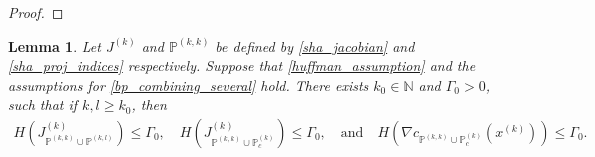 \documentclass{article}
\newtheorem{lemma}[theorem]{Lemma}
\theoremstyle{case}
\numberwithin{theorem}{subsection}
\newcommand{\huff}{{\Gamma_0}}
\newcommand{\naturals}{\mathbb N}
\newcommand{\xk}{x^{(k)}}
\newcommand{\trueactiveprojk}{{\mathbb P_c^{(k)}}}
\newcommand{\activeprojkk}{{\mathbb P^{(k, k)}}}
\newcommand{\activeprojkl}{{\mathbb P^{(k, l)}}}
\newcommand{\jackk}{{J^{(k)}}}
\newcommand{\jackkl}{{J^{(k)}_{\activeprojkk \cup \activeprojkl}}}
\newcommand{\jackt}{{J^{(k)}_{\activeprojkk \cup \trueactiveprojk}}}
\begin{document}
\begin{proof}
\end{proof}

\color{black}
\begin{lemma}
\label{huffman_constant_is_bounded}
Let $\jackk$ and $\activeprojkk$ be defined by \cref{sha_jacobian} and \cref{sha_proj_indices} respectively.
Suppose that \cref{huffman_assumption} and the assumptions for \cref{bp_combining_several} hold.
There exists $k_0 \in \naturals$ and $\huff > 0$, such that if $k, l \ge k_0$, then 
\begin{align*}
H\left(\jackkl \right) \le \huff,
\quad 
H\left(\jackt\right) \le \huff,
\quad \textrm{and} \quad
H\left(\nabla c_{\activeprojkk \cup \trueactiveprojk }\left(\xk\right)\right) \le \huff.
\end{align*}
\end{lemma}
\end{document}
